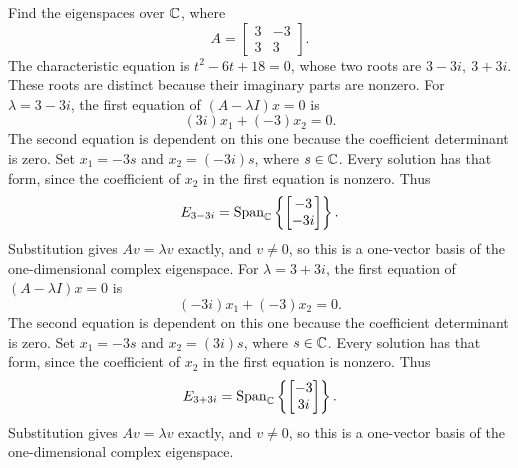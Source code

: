 \goal Find the eigenspaces over $\mathbb{C}$, where
\[A=\begin{bmatrix}3&-3\\3&3\end{bmatrix}.\]
The characteristic equation is $t^{2} - 6 t + 18=0$, whose two roots are $3 - 3 i,\ 3 + 3 i$. These roots are distinct because their imaginary parts are nonzero.
For $\lambda=3 - 3 i$, the first equation of $(A-\lambda I)x=0$ is
\[(3 i)x_1+(-3)x_2=0.\]
The second equation is dependent on this one because the coefficient determinant is zero. Set $x_1=-3s$ and $x_2=(- 3 i)s$, where $s\in\mathbb{C}$. Every solution has that form, since the coefficient of $x_2$ in the first equation is nonzero. Thus
\[E_{3 - 3 i}=\operatorname{Span}_{\mathbb{C}}\left\{\begin{bmatrix}-3\\- 3 i\end{bmatrix}\right\}.\]
Substitution gives $Av=\lambda v$ exactly, and $v\ne0$, so this is a one-vector basis of the one-dimensional complex eigenspace.
For $\lambda=3 + 3 i$, the first equation of $(A-\lambda I)x=0$ is
\[(- 3 i)x_1+(-3)x_2=0.\]
The second equation is dependent on this one because the coefficient determinant is zero. Set $x_1=-3s$ and $x_2=(3 i)s$, where $s\in\mathbb{C}$. Every solution has that form, since the coefficient of $x_2$ in the first equation is nonzero. Thus
\[E_{3 + 3 i}=\operatorname{Span}_{\mathbb{C}}\left\{\begin{bmatrix}-3\\3 i\end{bmatrix}\right\}.\]
Substitution gives $Av=\lambda v$ exactly, and $v\ne0$, so this is a one-vector basis of the one-dimensional complex eigenspace.


